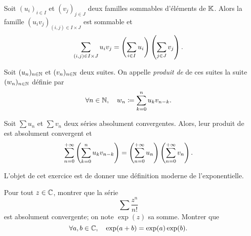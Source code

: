 \documentclass{magnolia}
\begin{document}
\begin{proposition}
  Soit $(u_i)_{i\in I}$ et $(v_j)_{j\in J}$ deux familles sommables d'éléments de $\mathbb{K}$.
  Alors la famille $(u_i v_j)_{(i,j)\in I\times J}$ est sommable et
  \[\sum_{(i,j)\in I\times J} u_i v_j = \left(\sum_{i\in I} u_i\right) \left(\sum_{j\in J} v_j\right).\]
  \end{proposition}



\begin{definition}
Soit $(u_n)_{n\in\mathbb{N}}$ et $(v_n)_{n\in\mathbb{N}}$ deux suites. On appelle
\emph{produit de } de ces suites la suite $(w_n)_{n\in\mathbb{N}}$
définie par
\[\forall n\in\mathbb{N},\quad w_n\coloneqq\sum_{k=0}^n u_k v_{n-k}.\]
\end{definition}

\begin{proposition}
Soit $\sum u_n$ et $\sum v_n$ deux séries absolument convergentes. Alors, leur produit de
 est absolument convergent et
\[\sum_{n=0}^{+\infty} \left(\sum_{k=0}^n u_k v_{n-k}\right)=
  \left(\sum_{n=0}^{+\infty} u_n\right)\left(\sum_{n=0}^{+\infty} v_n\right).\]
\end{proposition}

\begin{exoUnique}
\remarque L'objet de cet exercice est de donner une définition \og moderne \fg de l'exponentielle.
  \begin{questions}
  \question Pour tout $z\in\mathbb{C}$, montrer que la série
    \[\sum \frac{z^n}{n!}\]
    est absolument convergente; on note $\exp(z)$ sa somme.
  \question Montrer que
  \[\forall a,b\in\mathbb{C},\quad \exp(a+b)=\exp(a) \exp(b).\]
  \end{questions}


\end{exoUnique}


\end{document}

